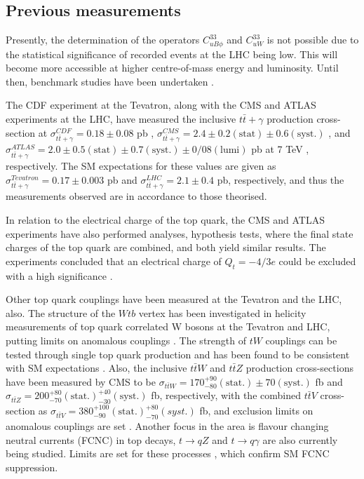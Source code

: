 \subsection{Previous measurements}

Presently, the determination of the operators $C^{33}_{uB\phi}$ and $C^{33}_{uW}$ is not possible due to the statistical significance of recorded events at the LHC being low. This will become more accessible at higher centre-of-mass energy and luminosity. Until then, benchmark studies have been undertaken \cite{pidsemilept}.

The CDF experiment at the Tevatron, along with the CMS and ATLAS experiments at the LHC, have measured the inclusive $t\bar{t}+\gamma$ production cross-section at $\sigma^{CDF}_{t\bar{t}+\gamma} = 0.18 \pm 0.08$ pb \cite{CDFttgamma}, $\sigma^{CMS}_{t\bar{t}+\gamma} = 2.4 \pm 0.2 (\text{stat}) \pm 0.6 (\text{syst.})$ \cite{CMS-PAS-TOP-13-011}, and $\sigma^{ATLAS}_{t\bar{t}+\gamma} = 2.0 \pm 0.5 (\text{stat}) \pm 0.7 (\text{syst.}) \pm 0/08 (\text{lumi})$ pb at 7 TeV \cite{ATLASttgamma}, respectively. The SM expectations for these values are given as $\sigma^{Tevatron}_{t\bar{t}+\gamma} = 0.17 \pm 0.003$ pb and $\sigma^{LHC}_{t\bar{t}+\gamma} = 2.1 \pm 0.4$ pb, respectively, and thus the measurements observed are in accordance to those theorised. 

In relation to the electrical charge of the top quark, the CMS and ATLAS experiments have also performed analyses, hypothesis tests, where the final state charges of the top quark are combined, and both yield similar results. The experiments concluded that an electrical charge of $Q_t = -4/3e$ could be excluded  with a high significance \cite{topchargeconstraints, ATLAStopcharge}.

Other top quark couplings have been measured at the Tevatron and the LHC, also. The structure of the $Wtb$ vertex has been investigated in helicity measurements of top quark correlated W bosons at the Tevatron and LHC, putting limits on anomalous couplings \cite{CDFD0combination, Whelicitytoppair, Wpolarisation}. The strength of $tW$ couplings can be tested through single top quark production and has been found to be consistent with SM expectations \cite{tsinglet, singlet}. Also, the inclusive $t\bar{t}W$ and $t\bar{t}Z$ production cross-sections have been measured by CMS to be $\sigma_{t\bar{t}W} = 170^{+90}_{-80}(\text{stat}.) \pm 70(\text{syst}.)$ fb and $\sigma_{t\bar{t}Z} = 200^{+80}_{-70}(\text{stat}.) ^{+40}_{-30}(\text{syst}.)$ fb, respectively, with the combined $t\bar{t}V$ cross-section as $\sigma_{t\bar{t}V} = 380^{+100}_{-90}(\text{stat}.)^{+80}_{-70}(syst.) $ fb, and exclusion limits on anomalous couplings are set \cite{Khachatryan:1712680}. Another focus in the area is flavour changing neutral currents (FCNC) in top decays, $t \to qZ$ and $t \to q\gamma$ are also currently being studied. Limits are set for these processes \cite{tqZ, FCNC}, which confirm SM FCNC suppression. 

